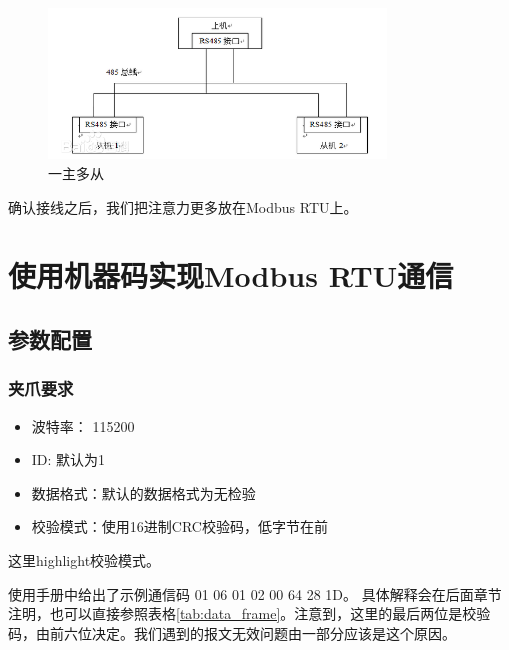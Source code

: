 \documentclass[UTF8]{ctexart}
\begin{document}
\begin{figure}[htbp]
    \centering
    \includegraphics[width=0.8\textwidth]{master_slave.png}
    \caption{一主多从}
    \label{ms}
\end{figure}
确认接线之后，我们把注意力更多放在Modbus RTU上。


\section{使用机器码实现Modbus RTU通信}
\subsection{参数配置}
\subsubsection{夹爪要求}
\begin{itemize}
    \item 波特率： 115200
    \item ID: 默认为1
    \item 数据格式：默认的数据格式为无检验
    \item 校验模式：使用16进制CRC校验码，低字节在前
\end{itemize}

这里highlight校验模式。

使用手册中给出了示例通信码 01 06 01 02 00 64 28 1D。
具体解释会在后面章节注明，也可以直接参照表格\eqref{tab:data_frame}。注意到，这里的最后两位是校验码，由前六位决定。我们遇到的报文无效问题由一部分应该是这个原因。
\end{document}
